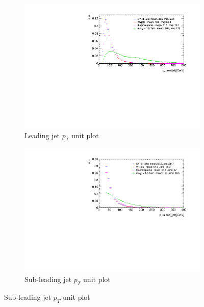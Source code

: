 \begin{figure}       
        \centering
        \begin{subfigure}[b]{0.475\textwidth}
            \centering
            \includegraphics[width=\textwidth]{Plots/ljet_pt_unitNC}
            \caption[]%
            {{\small Leading jet $p_{T}$ unit plot}}    
        \end{subfigure}
        \hfill
        \begin{subfigure}[b]{0.475\textwidth}  
            \centering 
            \includegraphics[width=\textwidth]{Plots/sjet_pt_unitNC}
            \caption[]%
            {{\small Sub-leading jet $p_{T}$ unit plot}}    
        \end{subfigure}

\end{figure}
